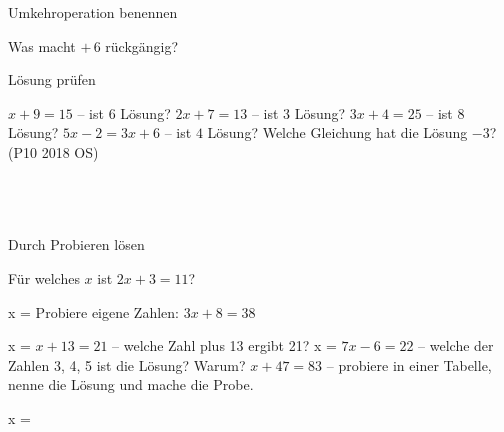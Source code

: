 \setcounter{aufgabe}{7}

\begin{aufgabe}{Umkehroperation benennen}
\begin{teile}
\teil Was macht $+\,6$ rückgängig? \leerfeld
\end{teile}
\end{aufgabe}

\begin{aufgabe}{Lösung prüfen}
\begin{teile}
\teil $x + 9 = 15$ – ist $6$ Lösung?
\teil $2x + 7 = 13$ – ist $3$ Lösung?
\teil $3x + 4 = 25$ – ist $8$ Lösung?
\teil $5x - 2 = 3x + 6$ – ist $4$ Lösung?
\teil Welche Gleichung hat die Lösung $-3$? \hfill (P10 2018 OS) \\  \\  \\  \\ 
\end{teile}
\end{aufgabe}

\begin{aufgabe}{Durch Probieren lösen}
\begin{teile}
\teil Für welches $x$ ist $2x + 3 = 11$?

x = \leerfeld
\teil Probiere eigene Zahlen: $3x + 8 = 38$

x = \leerfeld
\teil $x + 13 = 21$ – welche Zahl plus 13 ergibt 21? x = \leerfeld
\teil $7x - 6 = 22$ – welche der Zahlen 3, 4, 5 ist die Lösung? Warum?
\teil $x + 47 = 83$ – probiere in einer Tabelle, nenne die Lösung und mache die Probe.

x = \leerfeld
\end{teile}
\end{aufgabe}

